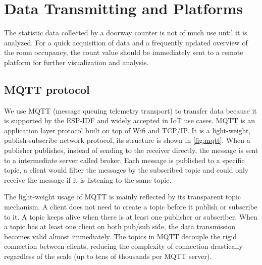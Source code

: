 \chapter{Data Transmitting and Platforms} \label{ch:platform}
The statistic data collected by a doorway counter is not of much use until it is analyzed. For a quick acquisition of data and a frequently updated overview of the room occupancy, the count value should be immediately sent to a remote platform for further visualization and analysis.
\section{MQTT protocol}
We use MQTT (message queuing telemetry transport) to transfer data because it is supported by the ESP-IDF and widely accepted in IoT use cases. MQTT is an application layer protocol built on top of Wifi and TCP/IP. It is a light-weight, publish-subscribe network protocol, its structure is shown in \autoref{fig:mqtt}. When a publisher publishes, instead of sending to the receiver directly, the message is sent to a intermediate server called broker. Each message is published to a specific topic, a client would filter the messages by the subscribed topic and could only receive the message if it is listening to the same topic.

The light-weight usage of MQTT is mainly reflected by its transparent topic mechanism. A client does not need to create a topic before it publish or subscribe to it. A topic keeps alive when there is at least one publisher or subscriber. When a topic has at least one client on both pub/sub side, the data transmission becomes valid almost immediately. The topics in MQTT decouple the rigid connection between clients, reducing the complexity of connection drastically regardless of the scale (up to tens of thousands per MQTT server).

